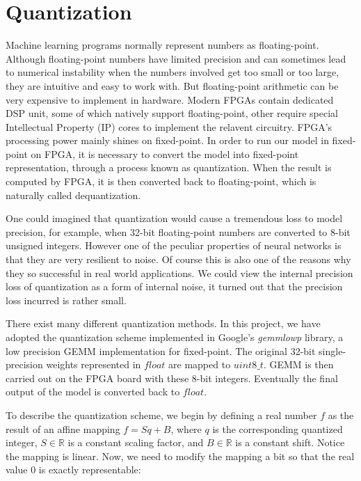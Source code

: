 
\chapter{Quantization}

Machine learning programs normally represent numbers as floating-point. Although floating-point numbers
have limited precision and can sometimes lead to numerical instability when the numbers involved get too
small or too large, they are intuitive and easy to work with. But floating-point arithmetic can be very
expensive to implement in hardware. Modern FPGAs contain dedicated DSP unit, some of which natively
support floating-point, other require special Intellectual Property (IP) cores to implement the relavent
circuitry. FPGA's processing power mainly shines on fixed-point. In order to run our model in fixed-point
on FPGA, it is necessary to convert the model into fixed-point representation, through a process known as
quantization. When the result is computed by FPGA, it is then converted back to floating-point, which is
naturally called dequantization.

One could imagined that quantization would cause a tremendous loss to model precision, for example, when
32-bit floating-point numbers are converted to 8-bit unsigned integers. However one of the peculiar
properties of neural networks is that they are very resilient to noise. Of course this is also one of the
reasons why they so successful in real world applications. We could view the internal precision loss of
quantization as a form of internal noise, it turned out that the precision loss incurred is rather small.

There exist many different quantization methods. In this project, we have adopted the quantization scheme
implemented in Google's \textit{gemmlowp} library, a low precision GEMM implementation for fixed-point. The
original 32-bit single-precision weights represented in $float$ are mapped to $uint8\_t$. GEMM is then
carried out on the FPGA board with these 8-bit integers. Eventually the final output of the model is
converted back to $float$.

To describe the quantization scheme, we begin by defining a real number $f$ as the result of an affine
mapping $f = S q + B$, where $q$ is the corresponding quantized integer, $S \in \mathbb{R}$ is a constant
scaling factor, and $B \in \mathbb{R}$ is a constant shift. Notice the mapping is linear. Now, we need to
modify the mapping a bit so that the real value $0$ is exactly representable:

